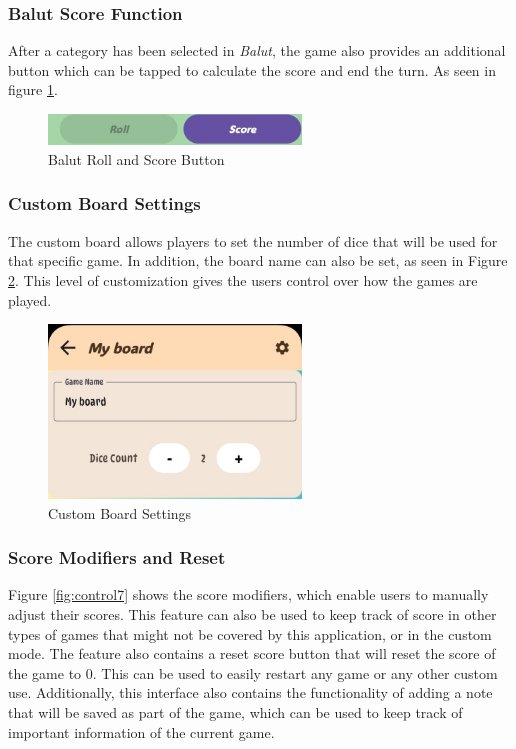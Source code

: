 \subsubsection{Balut Score Function}

After a category has been selected in \textit{Balut}, the game also provides an additional button which can be tapped to calculate the score and end the turn. As seen in figure \ref{fig:control5}.

\begin{figure}[ht!]
    \centering
    \includegraphics[width=0.6\textwidth]{img/control5.jpg}
    \caption{Balut Roll and Score Button}
    \label{fig:control5}
\end{figure}

\subsubsection{Custom Board Settings}

The custom board allows players to set the number of dice that will be used for that specific game. In addition, the board name can also be set, as seen in Figure \ref{fig:control6}. This level of customization gives the users control over how the games are played.

\begin{figure}[ht!]
    \centering
    \includegraphics[width=0.6\textwidth]{img/control6.jpg}
    \caption{Custom Board Settings}
    \label{fig:control6}
\end{figure}

\subsubsection{Score Modifiers and Reset}

Figure \ref{fig:control7} shows the score modifiers, which enable users to manually adjust their scores. This feature can also be used to keep track of score in other types of games that might not be covered by this application, or in the custom mode. The feature also contains a reset score button that will reset the score of the game to 0. This can be used to easily restart any game or any other custom use. Additionally, this interface also contains the functionality of adding a note that will be saved as part of the game, which can be used to keep track of important information of the current game.

